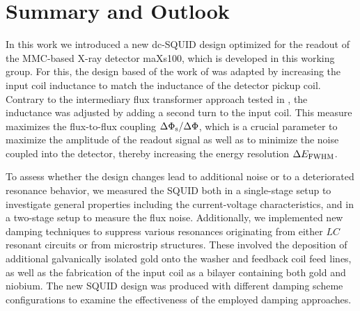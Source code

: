 \chapter{Summary and Outlook}

In this work we introduced a new dc-SQUID design optimized for the readout of the MMC-based X-ray detector maXs100, which is developed in this working group. For this, the design based of the work of \cite{Bauer2022} was adapted by increasing the input coil inductance to match the inductance of the detector pickup coil. Contrary to the intermediary flux transformer approach tested in \cite{Bauer2022}, the inductance was adjusted by adding a second turn to the input coil. This measure maximizes the flux-to-flux coupling $\Delta\Phi_{\rm s}/\Delta\Phi$, which is a crucial parameter to maximize the amplitude of the readout signal as well as to minimize the noise coupled into the detector, thereby increasing the energy resolution $\Delta E_{\rm FWHM}$.

To assess whether the design changes lead to additional noise or to a deteriorated resonance behavior, we measured the SQUID both in a single-stage setup to investigate general properties including the current-voltage characteristics, and in a two-stage setup to measure the flux noise. Additionally, we implemented new damping techniques to suppress various resonances originating from either $LC$ resonant circuits or from microstrip structures. These involved the deposition of additional galvanically isolated gold onto the washer and feedback coil feed lines, as well as the fabrication of the input coil as a bilayer containing both gold and niobium. The new SQUID design was produced with different damping scheme configurations to examine the effectiveness of the employed damping approaches. 

